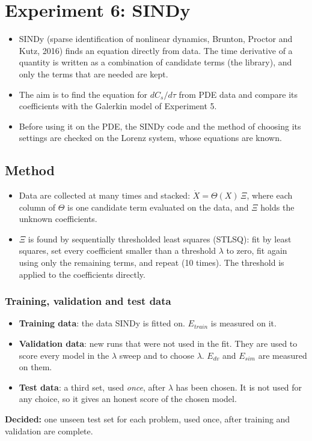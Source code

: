\documentclass[11pt,a4paper]{article}
\newcommand{\decided}[1]{\textcolor{green!40!black}{\textbf{Decided:} #1}}
\begin{document}
\clearpage
\section{Experiment 6: SINDy}
\begin{itemize}
  \item SINDy (sparse identification of nonlinear dynamics, Brunton, Proctor and Kutz, 2016) finds an equation directly from data. The time derivative of a quantity is written as a combination of candidate terms (the library), and only the terms that are needed are kept.
  \item The aim is to find the equation for $dC_s/d\tau$ from PDE data and compare its coefficients with the Galerkin model of Experiment 5.
  \item Before using it on the PDE, the SINDy code and the method of choosing its settings are checked on the Lorenz system, whose equations are known.
\end{itemize}

\subsection{Method}
\begin{itemize}
  \item Data are collected at many times and stacked: $\dot X=\Theta(X)\,\Xi$, where each column of $\Theta$ is one candidate term evaluated on the data, and $\Xi$ holds the unknown coefficients.
  \item $\Xi$ is found by sequentially thresholded least squares (STLSQ): fit by least squares, set every coefficient smaller than a threshold $\lambda$ to zero, fit again using only the remaining terms, and repeat (10 times). The threshold is applied to the coefficients directly.
\end{itemize}

\subsubsection{Training, validation and test data}
\begin{itemize}
  \item \textbf{Training data}: the data SINDy is fitted on. $E_{train}$ is measured on it.
  \item \textbf{Validation data}: new runs that were not used in the fit. They are used to score every model in the $\lambda$ sweep and to choose $\lambda$. $E_{dv}$ and $E_{sim}$ are measured on them.
  \item \textbf{Test data}: a third set, used \emph{once}, after $\lambda$ has been chosen. It is not used for any choice, so it gives an honest score of the chosen model.
\end{itemize}
\decided{one unseen test set for each problem, used once, after training and validation are complete.}
\end{document}
